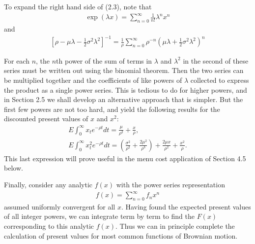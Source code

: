 \documentclass[12pt]{article}
\theoremstyle{definition}
\begin{document}
To expand the right hand side of (2.3), note that
\begin{align*}
\exp (\lambda x)=\sum_{n=0}^{\infty} \frac{1}{n !} \lambda^{n} x^{n}
\end{align*}
and
\begin{align*}
\left[\rho-\mu \lambda-\frac{1}{2} \sigma^{2} \lambda^{2}\right]^{-1}=\frac{1}{\rho} \sum_{n=0}^{\infty} \rho^{-n}\left(\mu \lambda+\frac{1}{2} \sigma^{2} \lambda^{2}\right)^{n}
\end{align*}

For each $n$, the $n$th power of the sum of terms in $\lambda$ and $\lambda^{2}$ in the second of these series must be written out using the binomial theorem. Then the two series can be multiplied together and the coefficients of like powers of $\lambda$ collected to express the product as a single power series. This is tedious to do for higher powers, and in Section 2.5 we shall develop an alternative approach that is simpler. But the first few powers are not too hard, and yield the following results for the discounted present values of $x$ and $x^{2}$:
\begin{gather}
E \int_{0}^{\infty} x_{t} e^{-\rho t} d t=\frac{\mu}{\rho^{2}}+\frac{x}{\rho}, \label{2.5} \\
E \int_{0}^{\infty} x_{t}^{2} e^{-\rho t} d t=\left(\frac{\sigma^{2}}{\rho^{2}}+\frac{2 \mu^{2}}{\rho^{3}}\right)+\frac{2 \mu x}{\rho^{2}}+\frac{x^{2}}{\rho} . \label{2.6}
\end{gather}
This last expression will prove useful in the menu cost application of Section 4.5 below.

Finally, consider any analytic $f(x)$ with the power series representation
\begin{align*}
f(x)=\sum_{n=0}^{\infty} f_{n} x^{n}
\end{align*}
assumed uniformly convergent for all $x$. Having found the expected present values of all integer powers, we can integrate term by term to find the $F(x)$ corresponding to this analytic $f(x)$. Thus we can in principle complete the calculation of present values for most common functions of Brownian motion.
\end{document}
